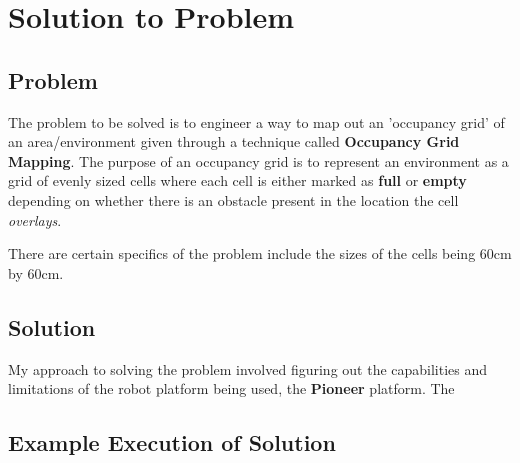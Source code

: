 \documentclass[a4paper,12pt]{article}
\begin{document}
\section{Solution to Problem}

\subsection{Problem}
\noindent The problem to be solved is to engineer a way to map out an 'occupancy grid' of an area/environment given through a technique called \textbf{Occupancy Grid Mapping}. The purpose of an occupancy grid is to represent an environment as a grid of evenly sized cells where each cell is either marked as \textbf{full} or \textbf{empty} depending on whether there is an obstacle present in the location the cell \textit{overlays}.

\vspace{5mm}
\noindent There are certain specifics of the problem include the sizes of the cells being 60cm by 60cm.
 
\subsection{Solution}
\noindent My approach to solving the problem involved figuring out the capabilities and limitations of the robot platform being used, the \textbf{Pioneer} platform. The 

\subsection{Example Execution of Solution}
\end{document}

